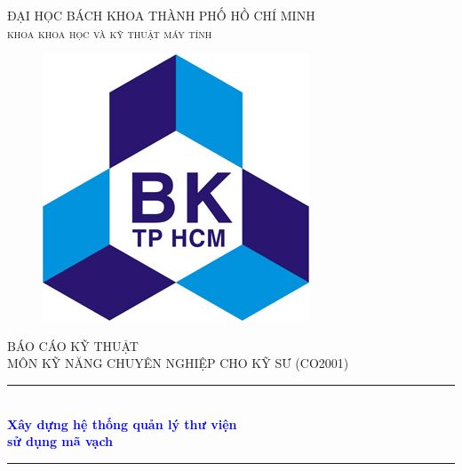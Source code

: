 \documentclass[12pt]{report}
\begin{document}
\usetikzlibrary{arrows,chains,positioning,scopes}


\begin{titlepage}

\newcommand{\HRule}{\rule{\linewidth}{0.5mm}} %

\center %
 
\begin{flushright}
\end{flushright}
\textsc{\large ĐẠI HỌC BÁCH KHOA THÀNH PHỐ HỒ CHÍ MINH}\\[0.2cm]
\textsc{\Large \scshape khoa khoa học và kỹ thuật máy tính}\\[0.5cm]
\begin{figure}[H] 
\centering
\includegraphics[scale=1.6]{images/logo.jpg}
\end{figure} 

\textsc{\large BÁO CÁO KỸ THUẬT \\ MÔN KỸ NĂNG CHUYÊN NGHIỆP CHO KỸ SƯ (CO2001)}\\[0.2cm] %

\HRule \\[0.4cm]
{ \huge \bfseries \textcolor{blue}{Xây dựng hệ thống quản lý thư viện \\ sử dụng mã vạch}}\\[0.4cm] %
\HRule \\[0.8cm]


\end{titlepage}
\end{document}
